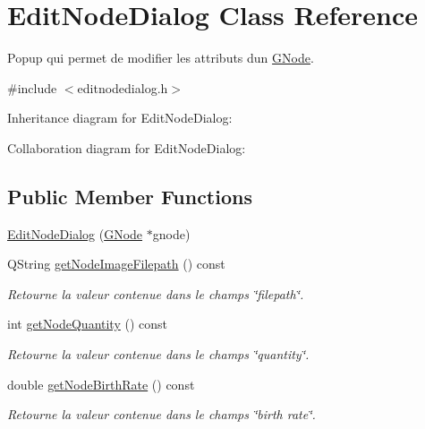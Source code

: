 \hypertarget{class_edit_node_dialog}{}\section{Edit\+Node\+Dialog Class Reference}
\label{class_edit_node_dialog}


Popup qui permet de modifier les attributs d\textquotesingle{}un \mbox{\hyperlink{struct_g_node}{G\+Node}}.  




{\ttfamily \#include $<$editnodedialog.\+h$>$}



Inheritance diagram for Edit\+Node\+Dialog\+:


Collaboration diagram for Edit\+Node\+Dialog\+:
\subsection*{Public Member Functions}
\begin{DoxyCompactItemize}
\item 
\mbox{\hyperlink{class_edit_node_dialog_ad4521b8c402fe2443755af0b66443de1}{Edit\+Node\+Dialog}} (\mbox{\hyperlink{struct_g_node}{G\+Node}} $\ast$gnode)
\item 
Q\+String \mbox{\hyperlink{class_edit_node_dialog_a332d0500932bcb07e9e2b6bb563f2caf}{get\+Node\+Image\+Filepath}} () const
\begin{DoxyCompactList}\small\item\em Retourne la valeur contenue dans le champs \char`\"{}filepath\char`\"{}. \end{DoxyCompactList}\item 
int \mbox{\hyperlink{class_edit_node_dialog_aacda0fe9314fb3165cd56394371a1ee4}{get\+Node\+Quantity}} () const
\begin{DoxyCompactList}\small\item\em Retourne la valeur contenue dans le champs \char`\"{}quantity\char`\"{}. \end{DoxyCompactList}\item 
double \mbox{\hyperlink{class_edit_node_dialog_ab314148e6b30966638e2be8352098ecd}{get\+Node\+Birth\+Rate}} () const
\begin{DoxyCompactList}\small\item\em Retourne la valeur contenue dans le champs \char`\"{}birth rate\char`\"{}. \end{DoxyCompactList}\end{DoxyCompactItemize}


